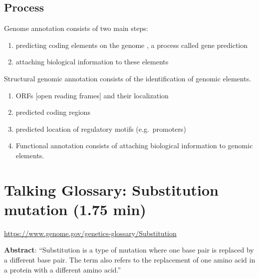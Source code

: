 \documentclass[
]{book}
\providecommand{\tightlist}{%
  \setlength{\itemsep}{0pt}\setlength{\parskip}{0pt}}
\begin{document}
\hypertarget{process}{%
\subsection{Process}\label{process}}

Genome annotation consists of two main steps:

\begin{enumerate}
\def\labelenumi{\arabic{enumi}.}
\tightlist
\item
  predicting coding elements on the genome , a process called gene prediction
\item
  attaching biological information to these elements
\end{enumerate}

Structural genomic annotation consists of the identification of genomic elements.

\begin{enumerate}
\def\labelenumi{\arabic{enumi}.}
\tightlist
\item
  ORFs {[}open reading frames{]} and their localization
\item
  predicted coding regions
\item
  predicted location of regulatory motifs (e.g.~promoters)
\item
  Functional annotation consists of attaching biological information to genomic elements.
\end{enumerate}

\hypertarget{talking-glossary-substitution-mutation-1.75-min}{%
\section{Talking Glossary: Substitution mutation (1.75 min)}\label{talking-glossary-substitution-mutation-1.75-min}}

\url{https://www.genome.gov/genetics-glossary/Substitution}

\textbf{Abstract}: ``Substitution is a type of mutation where one base pair is replaced by a different base pair. The term also refers to the replacement of one amino acid in a protein with a different amino acid.''
\end{document}
